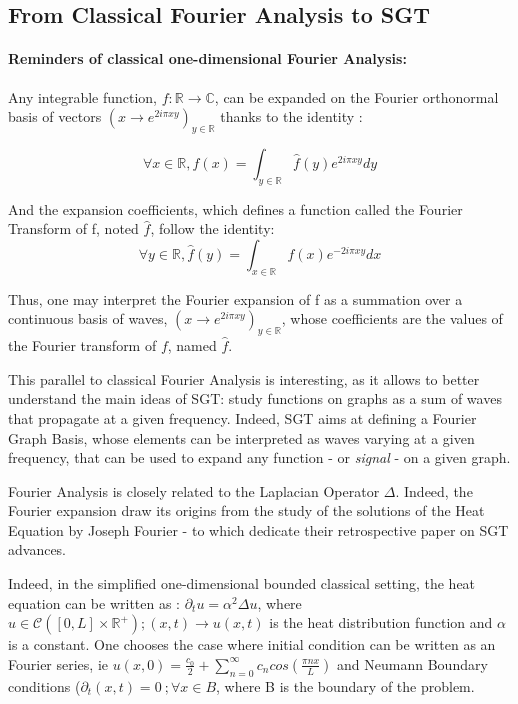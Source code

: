 \documentclass[sn-mathphys]{sn-jnl}%
\theoremstyle{thmstyleone}%
\theoremstyle{thmstyletwo}%
\theoremstyle{thmstylethree}%
\begin{document}
\subsection{From Classical Fourier Analysis to SGT}

\paragraph{Reminders of classical one-dimensional Fourier
  Analysis:} \label{par:classical_fourier_analysis} Any integrable
function, $f : \mathbb{R} \rightarrow \mathbb{C}$, can be expanded on
the Fourier orthonormal basis of vectors
$(x \rightarrow e^{2i\pi x y})_{y \in \mathbb{R}}$ thanks to the
identity :

\begin{equation}
    \forall x \in \mathbb{R}, f(x) = \int_{y \in \mathbb{R}} \hat{f}(y) e^{2i\pi x y} dy
\end{equation}

And the expansion coefficients, which defines a function called the
Fourier Transform of f, noted $\hat{f}$, follow the identity:
\begin{equation}
    \forall y \in \mathbb{R}, \hat{f}(y) = \int_{x \in \mathbb{R}} f(x) e^{-2i\pi x y} dx
\end{equation}

Thus, one may interpret the Fourier expansion of f as a summation over
a continuous basis of waves,
$(x \rightarrow e^{2i\pi x y})_{y \in \mathbb{R}}$, whose coefficients
are the values of the Fourier transform of $f$, named $\hat{f}$.

This parallel to classical Fourier Analysis is interesting, as it
allows to better understand the main ideas of SGT: study functions on
graphs as a sum of waves that propagate at a given frequency. Indeed,
SGT aims at defining a Fourier Graph Basis, whose elements can be
interpreted as waves varying at a given frequency, that can be used to
expand any function - or \textit{signal} - on a given graph.

Fourier Analysis is closely related to the Laplacian Operator
$\Delta$. Indeed, the Fourier expansion draw its origins from the
study of the solutions of the Heat Equation by Joseph Fourier - to
which \cite{ricaud_borgnat_tremblay_goncalves_vandergheynst_2019}
dedicate their retrospective paper on SGT advances.

Indeed, in the simplified one-dimensional bounded classical setting,
the heat equation can be written as :
$\partial_t u = \alpha^2 \Delta u$, where
$u \in \mathcal{C}([0,L]\times \mathbb{R}^+) ; (x,t) \rightarrow
u(x,t)$ is the heat distribution function and $\alpha$ is a
constant. One chooses the case where initial condition can be written
as an Fourier series, ie
$u(x, 0) = \frac{c_0}{2} + \sum_{n=0}^{\infty} c_n cos(\frac{\pi n
  x}{L})$ and Neumann Boundary conditions
($\partial_t(x,t)=0 \ ; \forall x \in B$, where B is the boundary of
the problem.
\end{document}
